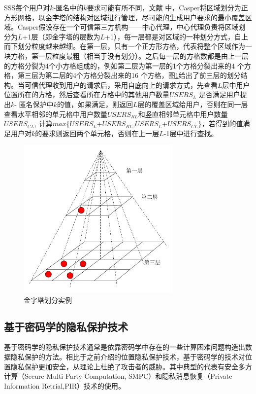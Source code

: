 SSS每个用户对$k$-匿名中的$k$要求可能有所不同，文献\cite{Mokbel} 中，Casper将区域划分为正方形网格，以金字塔的结构对区域进行管理，尽可能的生成用户要求的最小覆盖区域。Casper假设存在一个可信第三方机构——中心代理，中心代理负责将区域划分为$L$+1层（即金字塔的层数为$L$+1），每一层都是对区域的一种划分方式，自上而下划分粒度越来越细。在第一层，只有一个正方形方格，代表将整个区域作为一块方格，第一层粒度最粗（相当于没有划分）。之后每一层的方格数都是由上一层的方格分裂为4个小方格组成的，例如第二层为第一层的1个方格分裂出来的4 个方格，第三层为第二层的4个方格分裂出来的16 个方格，图\ref{fig:GoldTower_pdf}给出了前三层的划分结构。当可信代理收到用户的请求后，采用自底向上的请求方式，先查看$L$层中用户位置所在的方格，然后查看所在方格中的其他用户数量$USERS_L$ 是否满足用户提出$k$- 匿名保护中$k$的值，如果满足，则返回$L$层的覆盖区域给用户，否则在同一层查看水平相邻的单元格中用户数量$USERS_{RL}$和竖直相邻单元格中用户数量$USERS_{CL}$, 计算$max$\{$USERS_L$+$USERS_{RL}$,$USERS_L$+$USERS_{CL}$\}，若得到的值满足用户对$k$的要求则返回两个单元格，否则在上一层$L$-1层中进行查找。
\begin{figure}[H]
\centering
\includegraphics[width=8cm]{fig/GoldTower.pdf}
\caption{金字塔划分实例} %
\label{fig:GoldTower_pdf}
\end{figure}
\subsection{基于密码学的隐私保护技术}
基于密码学的隐私保护技术通常是依靠密码学中存在的一些计算困难问题构造出数据隐私保护的方法。相比于之前介绍的位置隐私保护技术，基于密码学的技术对位置隐私保护更加安全，从理论上杜绝了攻击者的威胁。其中典型的代表有安全多方计算（Secure Multi-Party Computation, SMPC）和隐私消息恢复（Private Information Retrial,PIR）技术的使用。

